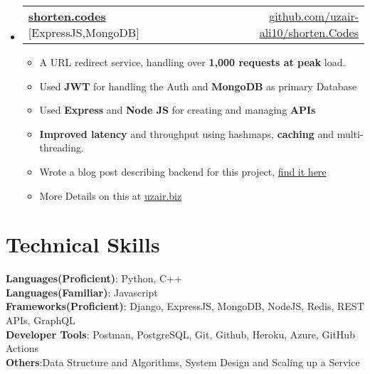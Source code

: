 \documentclass[letterpaper,11pt]{article}
\makeatletter
\newcommand{\resumeItem}[1]{
  \item\small{
    {#1 \vspace{-2pt}}
  }
}
\newcommand{\resumeProjectHeading}[2]{
    \item
    \begin{tabular*}{0.97\textwidth}{l@{\extracolsep{\fill}}r}
      \small#1 & #2 \\
    \end{tabular*}\vspace{-7pt}
}
\newcommand{\resumeSubHeadingListStart}{\begin{itemize}[leftmargin=0.15in, label={}]}
\newcommand{\resumeSubHeadingListEnd}{\end{itemize}}
\newcommand{\resumeItemListStart}{\begin{itemize}}
\newcommand{\resumeItemListEnd}{\end{itemize}\vspace{-5pt}}
\makeatother
\begin{document}
\resumeSubHeadingListStart
      \resumeProjectHeading
       {\textbf{\href{https://shorten.codes/}{shorten.codes}}{          [ExpressJS,MongoDB]}}{\href{https://github.com/uzair-ali10/shorten.Codes/}{github.com/uzair-ali10/shorten.Codes}}
          \resumeItemListStart
           \resumeItem{A URL redirect service, handling over \textbf{1,000 requests at peak} load.}
           \resumeItem{Used \textbf{JWT} for handling the Auth and \textbf{MongoDB} as primary Database}
           \resumeItem{Used \textbf{Express} and \textbf{Node JS} for creating and managing \textbf{APIs}}
           \resumeItem{\textbf{Improved latency}  and throughput using hashmaps, \textbf{caching} and multi-threading.}
           \resumeItem{Wrote a blog post describing backend for this project, \href{https://medium.com/@uzair-ali10/building-backend-of-a-url-shortening-service-part-i-b3b834895900}{find it here}}
           \resumeItem{More Details on this at \href{https://uzair.biz/}{uzair.biz}}
          \resumeItemListEnd
    \resumeSubHeadingListEnd


%
\section{Technical Skills}
 \begin{itemize}[leftmargin=0.15in, label={}]
    \small{\item{
     \textbf{Languages(Proficient)}{: Python, C++} \\
      \textbf{Languages(Familiar)}{: Javascript} \\
     \textbf{Frameworks(Proficient)}{: Django, ExpressJS, MongoDB, NodeJS, Redis, REST APIs, GraphQL} \\
     \textbf{Developer Tools}{: Postman, PostgreSQL, Git, Github, Heroku, Azure, GitHub Actions} \\
     \textbf{Others}{:Data Structure and Algorithms, System Design and Scaling up a Service}\\
    }}
 \end{itemize}
\end{document}
